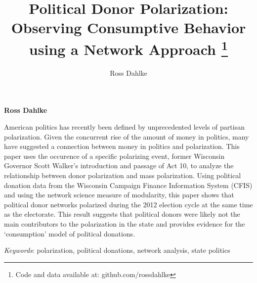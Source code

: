 \documentclass[12pt,]{article}
\title{Political Donor Polarization: Observing Consumptive Behavior using a
Network Approach \thanks{Code and data available at: github.com/rossdahlke}  }
\author{\Large Ross Dahlke\vspace{0.05in} \newline\normalsize\emph{}  }
\date{}
\newcommand*{\authorfont}{\fontfamily{phv}\selectfont}
\renewenvironment{abstract}
 {{%
    \setlength{\leftmargin}{0mm}
    \setlength{\rightmargin}{\leftmargin}%
  }%
  \relax}
 {\endlist}
\begin{document}
	
%

{%
\setlength{\parindent}{0pt}
\thispagestyle{plain}
{\fontsize{18}{20}\selectfont\raggedright 
\maketitle  %

}

{
   \vskip 13.5pt\relax \normalsize\fontsize{11}{12} 
\textbf{\authorfont Ross Dahlke} \hskip 15pt \emph{\small }   

}

}








\begin{abstract}

    \hbox{\vrule height .2pt width 39.14pc}

    \vskip 8.5pt %

\noindent American politics has recently been defined by unprecedented levels of
partisan polarization. Given the concurrent rise of the amount of money
in politics, many have suggested a connection between money in politics
and polarization. This paper uses the occurence of a specific polarizing
event, former Wisconsin Governor Scott Walker's introduction and passage
of Act 10, to analyze the relationship between donor polarization and
mass polarization. Using political donation data from the Wisconsin
Campaign Finance Information System (CFIS) and using the network science
measure of modularity, this paper shows that political donor networks
polarized during the 2012 election cycle at the same time as the
electorate. This result suggests that political donors were likely not
the main contributors to the polarization in the state and provides
evidence for the `consumption' model of political donations.


\vskip 8.5pt \noindent \emph{Keywords}: polarization, political donations, network analysis, state politics \par

    \hbox{\vrule height .2pt width 39.14pc}



\end{abstract}
\end{document}
